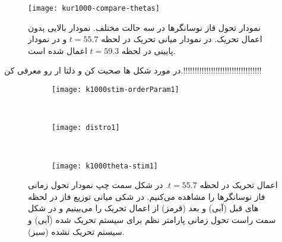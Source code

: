 \begin{figure}
	\centering
	\texttt{[image: kur1000-compare-thetas]}
    \caption{
نمودار تحول فاز نوسانگرها در سه حالت مختلف. نمودار بالایی بدون اعمال تحریک. در نمودار میانی تحریک در لحظه 
$t=55.7$
و در نمودار پایینی در لحظه 
$t=59.3$
اعمال شده است.
    }
    \label{fig:kur-compare-thetas}
\end{figure}

در مورد شکل ها صحبت کن و دلتا ار رو معرفی کن.!!!!!!!!!!!!!!!!!!!!!!!!!!!!!!!!!!

\begin{figure}
     \centering
     \begin{subfigure}[t]{0.3\textwidth}
         \centering
         \texttt{[image: k1000stim-orderParam1]}
     \end{subfigure}
     \
     \begin{subfigure}[t]{0.2\textwidth}
         \centering
         \texttt{[image: distro1]}
     \end{subfigure}
     \
     \begin{subfigure}[t]{0.4\textwidth}
         \centering
         \texttt{[image: k1000theta-stim1]}
     \end{subfigure}
        \caption{
اعمال تحریک در لحظه 
$t=55.7$.
در شکل سمت چپ نمودار تحول زمانی فاز نوسانگرها را مشاهده می‌کنیم. در شکی میانی توزیع فاز در لحظه های قبل (آبی) و بعد (قرمز) از اعمال تحریک را می‌بینیم و در شکل سمت راست تحول زمانی پارامتر نظم برای سیستم تحریک شده (آبی) و سیستم تحریک نشده  (سبز).
         }
\end{figure}

